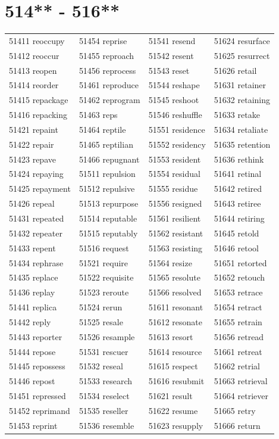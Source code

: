\documentclass[10pt, oneside]{book}
\begin{document}
\begin{table}
	\centering
	\section*{514** - 516**}
	\begin{tabular}{l l l l}
51411 reoccupy &51454 reprise &51541 resend &51624 resurface\\
51412 reoccur &51455 reproach &51542 resent &51625 resurrect\\
51413 reopen &51456 reprocess &51543 reset &51626 retail\\
51414 reorder &51461 reproduce &51544 reshape &51631 retainer\\
51415 repackage &51462 reprogram &51545 reshoot &51632 retaining\\
51416 repacking &51463 reps &51546 reshuffle &51633 retake\\
51421 repaint &51464 reptile &51551 residence &51634 retaliate\\
51422 repair &51465 reptilian &51552 residency &51635 retention\\
51423 repave &51466 repugnant &51553 resident &51636 rethink\\
51424 repaying &51511 repulsion &51554 residual &51641 retinal\\
51425 repayment &51512 repulsive &51555 residue &51642 retired\\
51426 repeal &51513 repurpose &51556 resigned &51643 retiree\\
51431 repeated &51514 reputable &51561 resilient &51644 retiring\\
51432 repeater &51515 reputably &51562 resistant &51645 retold\\
51433 repent &51516 request &51563 resisting &51646 retool\\
51434 rephrase &51521 require &51564 resize &51651 retorted\\
51435 replace &51522 requisite &51565 resolute &51652 retouch\\
51436 replay &51523 reroute &51566 resolved &51653 retrace\\
51441 replica &51524 rerun &51611 resonant &51654 retract\\
51442 reply &51525 resale &51612 resonate &51655 retrain\\
51443 reporter &51526 resample &51613 resort &51656 retread\\
51444 repose &51531 rescuer &51614 resource &51661 retreat\\
51445 repossess &51532 reseal &51615 respect &51662 retrial\\
51446 repost &51533 research &51616 resubmit &51663 retrieval\\
51451 repressed &51534 reselect &51621 result &51664 retriever\\
51452 reprimand &51535 reseller &51622 resume &51665 retry\\
51453 reprint &51536 resemble &51623 resupply &51666 return\\
	\end{tabular}
 \end{table}
\clearpage
\end{document}
